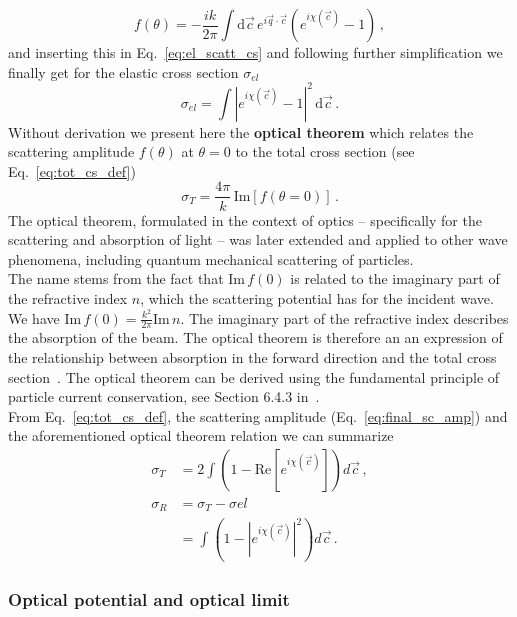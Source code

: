\begin{equation}\label{eq:final_sc_amp}
f(\theta) = -\frac{ik}{2\pi} \int \mathrm{d} \vec{c} \, e^{i \vec{q} \cdot \vec{c}} \left( e^{i \chi(\vec{c})} - 1 \right) \, ,
\end{equation}
and inserting this in Eq.~\ref{eq:el_scatt_cs} and following further simplification we finally get for the elastic cross section $\sigma_{el}$
\begin{equation}
\sigma_{el} = \int \left| e^{i \chi(\vec{c})} - 1 \right|^2 \, \mathrm{d} \vec{c} \, .
\end{equation}
Without derivation we present here the \textbf{optical theorem} which relates the scattering amplitude $f(\theta)$ at $\theta = 0$ to the total cross section (see Eq.~\ref{eq:tot_cs_def})
\begin{equation}
\sigma_T = \frac{4\pi}{k} \, \text{Im} \left[ f(\theta = 0) \right] \, .
\end{equation}
The optical theorem, formulated in the context of optics -- specifically for the scattering and absorption of light -- was later extended and applied to other wave phenomena, including quantum mechanical scattering of particles.\\
The name stems from the fact that $\text{Im}\, f(0)$ is related to the imaginary part of the refractive index $n$, which the scattering potential has for the incident wave. We have $\text{Im}\, f(0) = \frac{k^2}{2\pi} \text{Im}\, n$. The imaginary part of the refractive index describes the absorption of the beam. The optical theorem is therefore an an expression of the relationship between absorption in the forward direction and the total cross section~\cite{mayer2013kernphysik}.
The optical theorem can be derived using the fundamental principle of particle current conservation, see Section 6.4.3 in~\cite{sakurai2020modern}.\\
From Eq.~\ref{eq:tot_cs_def}, the scattering amplitude (Eq.~\ref{eq:final_sc_amp}) and the aforementioned optical theorem relation we can summarize
\begin{align}
\sigma_{T} &=  2 \int \left(1 - \text{Re}\left[e^{i\chi(\vec{c})}\right]\right) d\vec{c} \, , \\
\sigma_{R} &= \sigma_{T} - \sigma{el} \\
           &= \int \left(1 - \left|e^{i\chi(\vec{c})}\right|^2\right) d\vec{c} \label{eq:simga_reaction} \, .
\end{align}

\subsubsection{Optical potential and optical limit}

